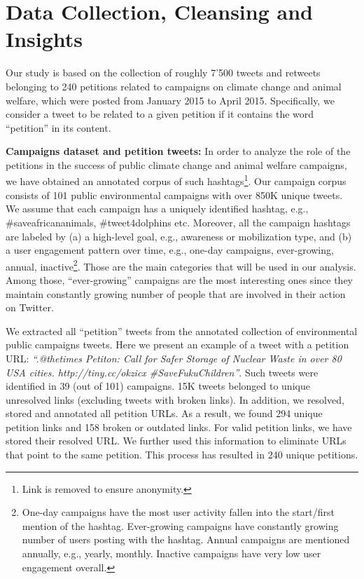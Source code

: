 \section{Data Collection, Cleansing and Insights}
\label{sec:dataset}

Our study is based on the collection of roughly 7'500 tweets and retweets belonging to 240 petitions related to campaigns on climate change and animal welfare, which were posted from January 2015 to April 2015. Specifically, we consider a tweet to be related to a given petition if it contains the word ``petition'' in its content. 

\textbf{Campaigns dataset and petition tweets:}
In order to analyze the role of the petitions in the success of public climate change and animal welfare campaigns,
we have obtained an annotated corpus of such hashtags\footnote{Link is removed to ensure anonymity.}. 
Our campaign corpus consists of 101 public environmental campaigns with over 850K unique tweets. 
We assume that each campaign has a uniquely identified hashtag, e.g., \#saveafricananimals, \#tweet4dolphins etc.
Moreover, all the campaign hashtags are labeled by (a) a high-level goal, e.g., awareness or mobilization type, and (b) a user engagement pattern over time, e.g., one-day campaigns, ever-growing, annual, inactive\footnote{One-day campaigns have the most user activity fallen  into the start/first mention of the hashtag.
Ever-growing campaigns have constantly growing number of users posting with the hashtag.
Annual campaigns are mentioned annually, e.g., yearly, monthly. Inactive campaigns have very low user engagement overall.}.
Those are the main categories that will be used in our analysis. Among those, ``ever-growing'' campaigns are the most interesting ones since they maintain  constantly growing number of people that are involved in their action on Twitter.

We extracted all ``petition'' tweets from the annotated collection of environmental public campaigns tweets.
Here we present an example of a tweet with a petition URL: \textit{``.@thetimes Petiton: Call for Safer Storage of Nuclear Waste in over 80 USA cities. http://tiny.cc/okzicx  \#SaveFukuChildren''}.
Such tweets were identified in 39 (out of 101) campaigns. 15K tweets belonged to unique unresolved links (excluding tweets with broken links).
In addition, we resolved, stored and annotated all petition URLs. As a result, we found 294 unique petition links and 158 broken or outdated links.
For valid petition links, we have stored their resolved URL. We further used this information to eliminate URLs that point to the same petition.
This process has resulted in 240 unique petitions.

